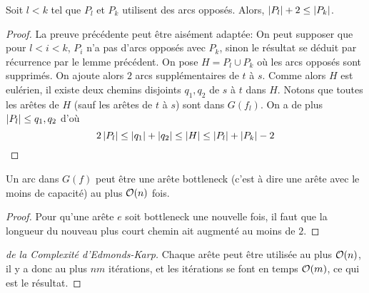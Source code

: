 \documentclass[math, info]{cours}
\begin{document}
\begin{lemme}
	Soit $l < k$ tel que $P_{l}$ et $P_{k}$ utilisent des arcs opposés.
	Alors, $\left|P_{l}\right| + 2 \leq \left|P_{k}\right|$.
	\label{lem:edmondskarp2}
\end{lemme}
\begin{proof}
	La preuve précédente peut être aisément adaptée:
	On peut supposer que pour $l < i < k$, $P_{i}$ n'a pas d'arcs opposés avec $P_{k}$, sinon le résultat se déduit par récurrence par le lemme précédent.
	On pose $H = P_{l} \cup P_{k}$ où les arcs opposés sont supprimés.
	On ajoute alors $2$ arcs supplémentaires de $t$ à $s$.
	Comme alors $H$ est eulérien, il existe deux chemins disjoints $q_{1}, q_{2}$ de $s$ à $t$ dans $H$.
	Notons que toutes les arêtes de $H$ (sauf les arêtes de $t$ à $s$) sont dans $G(f_{l})$.
	On a de plus $\left|P_{l}\right| \leq q_{1}, q_{2}$ d'où
	\begin{equation*}
		2\left|P_{l}\right| \leq \left|q_{1}\right| + \left|q_{2}\right| \leq \left|H\right| \leq \left|P_{l}\right| + \left|P_{k}\right| - 2
	\end{equation*}
\end{proof}

\begin{lemme}
	Un arc dans $G(f)$ peut être une arête bottleneck (c'est à dire une arête avec le moins de capacité) au plus $\mathcal{O}(n)$ fois.
\end{lemme}
\begin{proof}
	Pour qu'une arête $e$ soit bottleneck une nouvelle fois, il faut que la longueur du nouveau plus court chemin ait augmenté au moins de $2$.
\end{proof}


\begin{proof}[de la Complexité d'Edmonds-Karp]
	Chaque arête peut être utilisée au plus $\mathcal{O}(n)$, il y a donc au plus $nm$ itérations, et les itérations se font en temps $\mathcal{O}(m)$, ce qui est le résultat.
\end{proof}
\end{document}
